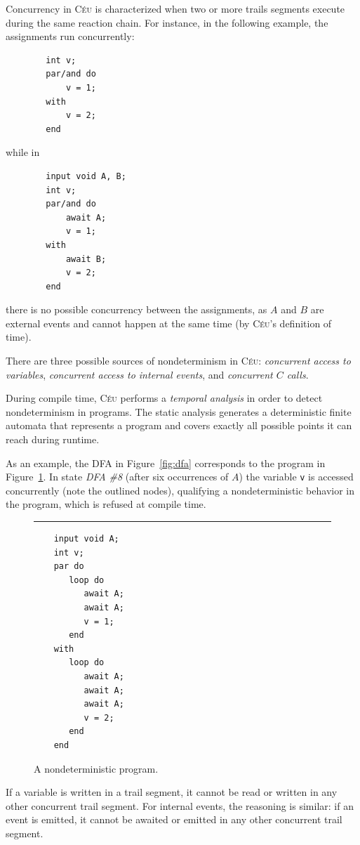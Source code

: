 \documentclass{sigplan-proc}
\newcommand{\2}{\;\;}
\newcommand{\5}{\;\;\;\;\;}
\newcommand{\CEU}{\textsc{C\'{e}u}}
\newcommand{\code}[1] {{\small{\texttt{#1}}}}
\begin{document}
Concurrency in \CEU{} is characterized when two or more trails segments execute 
during the same reaction chain.
For instance, in the following example, the assignments run concurrently:
{\small
\begin{verbatim}
        int v;
        par/and do
            v = 1;
        with
            v = 2;
        end
\end{verbatim}
}
while in
{\small
\begin{verbatim}
        input void A, B;
        int v;
        par/and do
            await A;
            v = 1;
        with
            await B;
            v = 2;
        end
\end{verbatim}
}
there is no possible concurrency between the assignments, as $A$ and $B$ are 
external events and cannot happen at the same time (by \CEU's definition of 
time).

There are three possible sources of nondeterminism in \CEU:
\emph{concurrent access to variables},
\emph{concurrent access to internal events},
and \emph{concurrent $C$ calls}.

During compile time, \CEU{} performs a \emph{temporal analysis} in order to 
detect nondeterminism in programs.
The static analysis generates a deterministic finite automata that represents a 
program and covers exactly all possible points it can reach during runtime.

As an example, the DFA in Figure~\ref{fig:dfa} corresponds to the program in 
Figure~\ref{lst:ceu:det}.
In state \emph{DFA \#8} (after six occurrences of $A$) the variable \code{v} is 
accessed concurrently (note the outlined nodes), qualifying a nondeterministic 
behavior in the program, which is refused at compile time.

\begin{figure}[t]
\rule{8.5cm}{0.37pt}
{\small
\begin{verbatim}
    input void A;
    int v;
    par do
       loop do
          await A;
          await A;
          v = 1;
       end
    with
       loop do
          await A;
          await A;
          await A;
          v = 2;
       end
    end
\end{verbatim}
}
\caption{ A nondeterministic program.
\label{lst:ceu:det}
}
\end{figure}


If a variable is written in a trail segment, it cannot be read or written in 
any other concurrent trail segment.
For internal events, the reasoning is similar: if an event is emitted, it 
cannot be awaited or emitted in any other concurrent trail segment.
\end{document}
